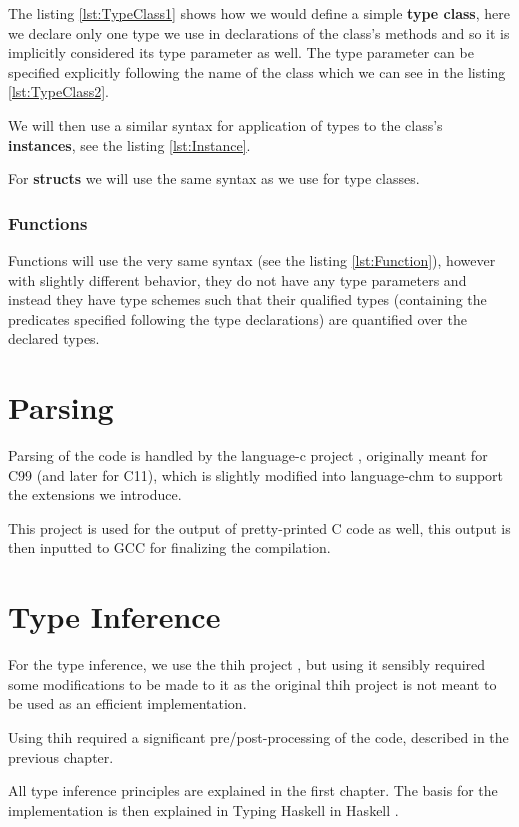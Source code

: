 The listing \ref{lst:TypeClass1} shows how we would define a simple \textbf{type class}, here we declare only one type we use in declarations of the class's methods and so it is implicitly considered its type parameter as well. The type parameter can be specified explicitly following the name of the class which we can see in the listing \ref{lst:TypeClass2}.

We will then use a similar syntax for application of types to the class's \textbf{instances}, see the listing \ref{lst:Instance}.

For \textbf{structs} we will use the same syntax as we use for type classes.

\subsubsection{Functions}

Functions will use the very same syntax (see the listing \ref{lst:Function}), however with slightly different behavior, they do not have any type parameters and instead they have type schemes such that their qualified types (containing the predicates specified following the type declarations) are quantified over the declared types.

\section{Parsing}

Parsing of the code is handled by the language-c project \cite{visq2018language-c}, originally meant for C99 (and later for C11), which is slightly modified into language-chm to support the extensions we introduce.

This project is used for the output of pretty-printed C code as well, this output is then inputted to GCC for finalizing the compilation.

\section{Type Inference}

For the type inference, we use the thih project \cite{jones1999typing}, but using it sensibly required some modifications to be made to it as the original thih project is not meant to be used as an efficient implementation.

Using thih required a significant pre/post-processing of the code, described in the previous chapter. %

All type inference principles are explained in the first chapter. The basis for the implementation is then explained in Typing Haskell in Haskell \cite{jones1999typing}.

